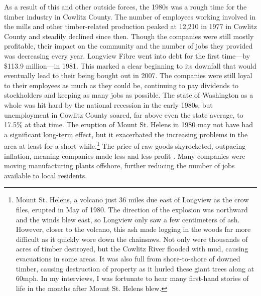As a result of this and other outside forces, the 1980s was a rough time for the timber industry in Cowlitz County. The number of employees working involved in the mills and other timber-related production peaked at 12,210 in 1977 in Cowlitz County and steadily declined since then. Though the companies were still mostly profitable, their impact on the community and the number of jobs they provided was decreasing every year. Longview Fibre went into debt for the first time—by \$113.9 million—in 1981. This marked a clear beginning to its downfall that would eventually lead to their being bought out in 2007. The companies were still loyal to their employees as much as they could be, continuing to pay dividends to stockholders and keeping as many jobs as possible. The state of Washington as a whole was hit hard by the national recession in the early 1980s, but unemployment in Cowlitz County soared, far above even the state average, to 17.5\% at that time. The eruption of Mount St. Helens in 1980 may not have had a significant long-term effect, but it exacerbated the increasing problems in the area at least for a short while.\footnote{Mount St. Helens, a volcano just 36 miles due east of Longview as the crow files, erupted in May of 1980. The direction of the explosion was northward and the winds blew east, so Longview only saw a few centimeters of ash. However, closer to the volcano, this ash made logging in the woods far more difficult as it quickly wore down the chainsaws. Not only were thousands of acres of timber destroyed, but the Cowlitz River flooded with mud, causing evacuations in some areas. It was also full from shore-to-shore of downed timber, causing destruction of property as it hurled these giant trees along at 60mph. In my interviews, I was fortunate to hear many first-hand stories of life in the months after Mount St. Helens blew.} The price of raw goods skyrocketed, outpacing inflation, meaning companies made less and less profit \citep[268]{wilma_2017}. Many companies were moving manufacturing plants offshore, further reducing the number of jobs available to local residents.

